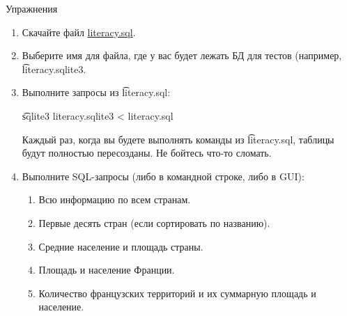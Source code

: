 \begin{frame}{Упражнения}
	\begin{enumerate}
		\item Скачайте файл \href{https://www.dropbox.com/s/jo26qgwysxsb8aj/literacy.sql?dl=0}{literacy.sql}.
		\item Выберите имя для файла, где у вас будет лежать БД для тестов (например, \t{literacy.sqlite3}.
		\item Выполните запросы из \t{literacy.sql}:
			\begin{center}
				\t{sqlite3 literacy.sqlite3 < literacy.sql}
			\end{center}
			Каждый раз, когда вы будете выполнять команды из \t{literacy.sql}, таблицы
			будут полностью пересозданы.
			Не бойтесь что-то сломать.
		\item
		     Выполните SQL-запросы (либо в командной строке, либо в GUI):
		     \begin{enumerate}
		     	\item Всю информацию по всем странам.
		     	\item Первые десять стран (если сортировать по названию).
		     	\item Средние население и площадь страны.
		     	\item Площадь и население Франции.
		     	\item Количество французских территорий и их суммарную площадь и население.
		     \end{enumerate}
	\end{enumerate}
\end{frame}

